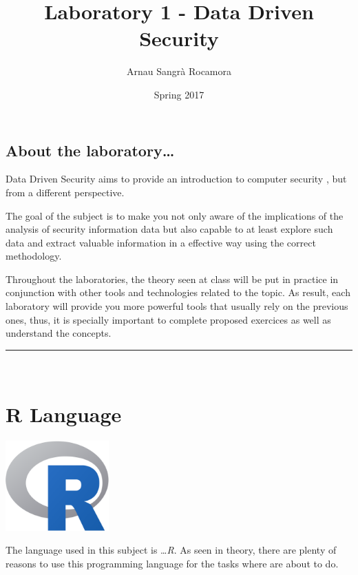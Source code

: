 \documentclass[]{article}
\title{Laboratory 1 - Data Driven Security}
\author{Arnau Sangrà Rocamora}
\date{Spring 2017}
\begin{document}
\maketitle

{
\setcounter{tocdepth}{2}
\tableofcontents
}
\subsection{About the laboratory\ldots{}}\label{about-the-laboratory}

Data Driven Security aims to provide an introduction to computer
security , but from a different perspective.

The goal of the subject is to make you not only aware of the
implications of the analysis of security information data but also
capable to at least explore such data and extract valuable information
in a effective way using the correct methodology.

Throughout the laboratories, the theory seen at class will be put in
practice in conjunction with other tools and technologies related to the
topic. As result, each laboratory will provide you more powerful tools
that usually rely on the previous ones, thus, it is specially important
to complete proposed exercices as well as understand the concepts.

\begin{center}\rule{0.5\linewidth}{\linethickness}\end{center}

~

\section{R Language}\label{r-language}

\begin{center}\includegraphics[width=150px]{figures/Rlogo} \end{center}

The language used in this subject is \ldots{}\emph{R}. As seen in
theory, there are plenty of reasons to use this programming language for
the tasks where are about to do.
\end{document}
